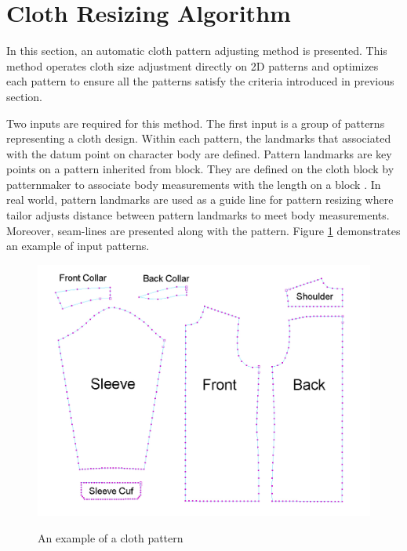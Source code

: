 
\section{Cloth Resizing Algorithm }
In this section, an automatic cloth pattern adjusting method is presented. This method operates cloth size adjustment directly on 2D patterns and optimizes each pattern to ensure all the patterns satisfy the criteria introduced in previous section.

Two inputs are required for this method. The first input is a group of patterns representing a cloth design. Within each pattern, the landmarks that associated with the datum point on character body are defined.  Pattern landmarks are key points on a pattern inherited from block. They are defined on the cloth block by patternmaker to associate body measurements with the length on a block . In real world, pattern landmarks are used as a guide line for pattern resizing where tailor adjusts distance between pattern landmarks to meet body measurements. Moreover, seam-lines are presented along with the pattern. Figure \ref{figure:pattern_example} demonstrates an example of input patterns.

\begin{figure}[h]
	\includegraphics[width=\columnwidth]{../images/pattern_example}\\[0.1cm]
    \caption{An example of a cloth pattern}
    \label{figure:pattern_example}
\end{figure}

